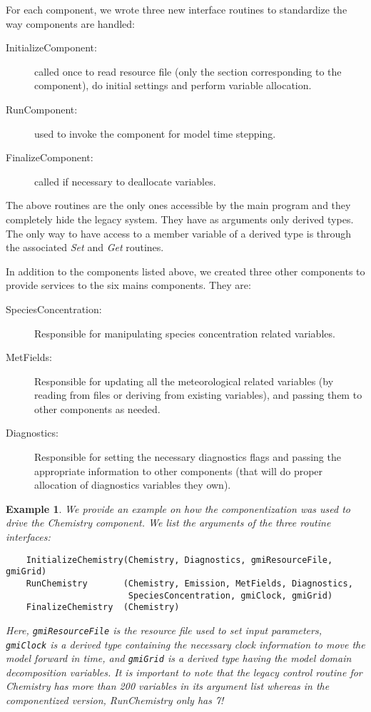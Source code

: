 \documentclass[11pt]{article}
\def\bd{\begin{description}}
\def\ed{\end{description}}
\newtheorem{example}{Example}
\begin{document}
For each component, we wrote three new interface routines to standardize the way 
components are handled:
%
\bd
\item[InitializeComponent:] called once to read resource file (only the section 
     corresponding to the component), do initial settings
     and perform variable allocation.
\item[RunComponent:] used to invoke the component for model time stepping.
\item[FinalizeComponent:] called if necessary to deallocate variables.
\ed
The above routines are the only ones accessible by the main program and
they completely hide the legacy system.
They have as arguments only derived types.
The only way to have access to a member variable of a derived type is through the
associated {\em Set} and {\em Get} routines.

In addition to the components listed above, we created three other components
to provide services to the six mains components.
They are:
\bd 
\item[SpeciesConcentration:] Responsible for manipulating species concentration 
     related variables.
\item[MetFields:] Responsible for updating all the meteorological related variables
     (by reading from files or deriving from existing variables), and passing them
     to other components as needed.
\item[Diagnostics:] Responsible for setting the necessary diagnostics flags and
     passing the appropriate information to other components (that will do 
     proper allocation of diagnostics variables they own).
\ed

\begin{example}
We provide an example on how the componentization was used to drive
the Chemistry component.
We list the arguments of the three routine interfaces:
\begin{verbatim}
    InitializeChemistry(Chemistry, Diagnostics, gmiResourceFile, gmiGrid)
    RunChemistry       (Chemistry, Emission, MetFields, Diagnostics, 
                        SpeciesConcentration, gmiClock, gmiGrid)
    FinalizeChemistry  (Chemistry)
\end{verbatim}
Here, {\tt gmiResourceFile} is the resource file used to set input parameters, 
{\tt gmiClock} is a derived
type containing the necessary clock information to move the model forward in time,
and {\tt gmiGrid} is a derived type having the model domain decomposition variables.
It is important to note that the legacy control routine for Chemistry has more
than 200 variables in its argument list whereas in the componentized version,
RunChemistry only has 7!
\newline

\end{example}
\end{document}
